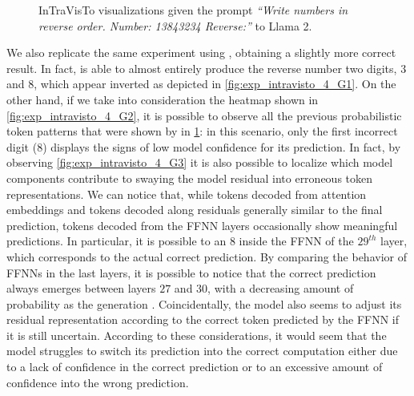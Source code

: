 \begin{figure}[t!]
    \centering
    \quad
    \caption{InTraVisTo visualizations given the prompt \emph{``Write numbers in reverse order. Number: 13843234 Reverse:''} to Llama 2.}
    \label{fig:exp_intravisto_4_F}
\end{figure}

We also replicate the same experiment using , obtaining a slightly more correct result.
In fact,  is able to almost entirely produce the reverse number  two digits, $3$ and $8$, which appear inverted as depicted in \cref{fig:exp_intravisto_4_G1}.
On the other hand, if we take into consideration the heatmap shown in \cref{fig:exp_intravisto_4_G2}, it is possible to observe all the previous probabilistic token patterns that were shown by  in \cref{fig:exp_intravisto_4_F}: in this scenario, only the first incorrect digit ($8$) displays the signs of low model confidence for its prediction.
In fact, by observing \cref{fig:exp_intravisto_4_G3} it is also possible to localize which model components contribute to swaying the model residual into erroneous token representations.
We can notice that, while tokens decoded from attention embeddings  and tokens decoded along residuals  generally similar to the final prediction, tokens decoded from the FFNN layers occasionally show meaningful predictions.
In particular, it is possible to  an $8$ inside the FFNN of the $29^{th}$ layer, which corresponds to the actual correct prediction.
By comparing the behavior of FFNNs in the last layers, it is possible to notice that the correct prediction always emerges between layers $27$ and $30$, with a decreasing amount of probability as the generation .
Coincidentally, the model also seems to adjust its residual representation according to the correct token predicted by the FFNN if it is still uncertain.
According to these considerations, it would seem that the model struggles to switch its prediction into the correct computation either due to a lack of confidence in the correct prediction or to an excessive amount of confidence into the wrong prediction.

